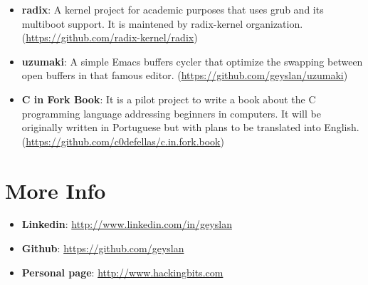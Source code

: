 \documentclass[margin]{res}
\begin{document}
\begin{resume}
\begin{itemize}
		    \item \textbf{radix}: A kernel project for academic purposes that uses grub and its multiboot support.
                                          It is maintened by radix-kernel organization.\newline
                                          (\url{https://github.com/radix-kernel/radix})\vspace{1mm}

		    \item \textbf{uzumaki}: A simple Emacs buffers cycler that optimize the swapping between open buffers in that famous
                                            editor.\newline
                                            (\url{https://github.com/geyslan/uzumaki})\vspace{1mm}

		    \item \textbf{C in Fork Book}: It is a pilot project to write a book about the C programming language addressing
                                                   beginners in computers. It will be originally written in Portuguese but with plans
                                                   to be translated into English.\newline
                                                   (\url{https://github.com/c0defellas/c.in.fork.book})
		\end{itemize}

\section{More Info}
    \begin{itemize}
        \item \textbf{Linkedin}: \url{http://www.linkedin.com/in/geyslan}
         \item \textbf{Github}: \url{https://github.com/geyslan}
         \item \textbf{Personal page}: \url{http://www.hackingbits.com}
    \end{itemize}

\end{resume}
\end{document}

